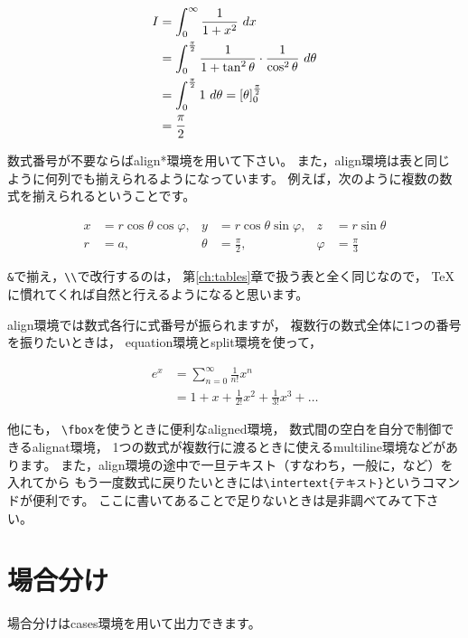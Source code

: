 \documentclass[class=jreport, crop=false, preview=false, dvipdfmx, fleqn]{standalone}
\begin{document}
\begin{IOTeX*}
\begin{align}
I & = \int_0^{\infty} \frac{1}{1 + x^2} \ dx \\
  & = \int_0^{\frac{\pi}{2}} \frac{1}{1 + \tan^2 \theta} \cdot \frac{1}{\cos^2 \theta} \ d\theta \\
  & = \int_0^{\frac{\pi}{2}} 1 \ d\theta = \left[ \theta \right]_0^{\frac{\pi}{2}} \notag \\
  & = \frac{\pi}{2}
\end{align}
\end{IOTeX*}

数式番号が不要ならばalign*環境を用いて下さい。
また，align環境は表と同じように何列でも揃えられるようになっています。
例えば，次のように複数の数式を揃えられるということです。
\begin{IOTeX*}
\begin{align*}
x & = r \cos\theta \cos\varphi, & y & = r \cos\theta \sin\varphi, & z & = r \sin\theta \\
r & = a, & \theta & = \frac{\pi}{2}, & \varphi & = \frac{\pi}{3}
\end{align*}
\end{IOTeX*}

\verb|&|で揃え，\verb|\\|で改行するのは，
第\ref{ch:tables}章で扱う表と全く同じなので，
{\TeX}に慣れてくれば自然と行えるようになると思います。

align環境では数式各行に式番号が振られますが，
複数行の数式全体に1つの番号を振りたいときは，
equation環境とsplit環境を使って，
\begin{IOTeX}
\begin{equation}
  \begin{split}
    e^x & = \sum_{n=0}^{\infty} \frac{1}{n!} x^n \\
      & = 1 + x + \frac{1}{2!} x^2 + \frac{1}{3!} x^3 + \dots 
  \end{split}
\end{equation}
\end{IOTeX}

他にも，
\verb|\fbox|を使うときに便利なaligned環境，
数式間の空白を自分で制御できるalignat環境，
1つの数式が複数行に渡るときに使えるmultiline環境などがあります。
また，align環境の途中で一旦テキスト（すなわち，一般に，など）を入れてから
もう一度数式に戻りたいときには\verb|\intertext{テキスト}|というコマンドが便利です。
ここに書いてあることで足りないときは是非調べてみて下さい。



\section{場合分け}
場合分けはcases環境を用いて出力できます。
\end{document}
